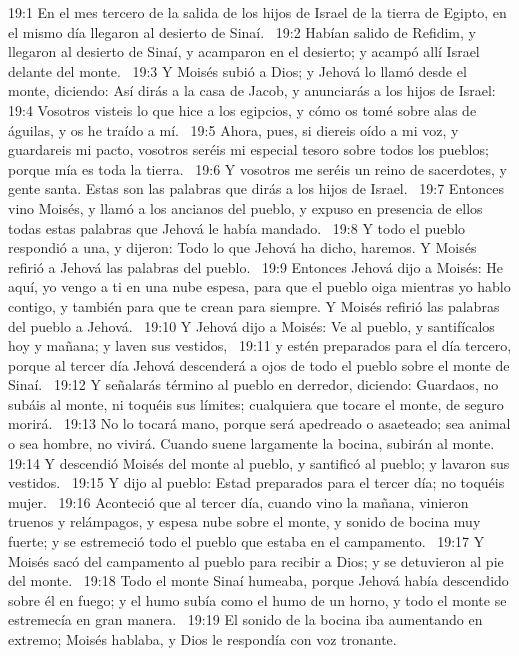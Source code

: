 19:1 En el mes tercero de la salida de los hijos de Israel de la tierra de Egipto, en el mismo día llegaron al desierto de Sinaí.  
19:2 Habían salido de Refidim, y llegaron al desierto de Sinaí, y acamparon en el desierto; y acampó allí Israel delante del monte.  
19:3 Y Moisés subió a Dios; y Jehová lo llamó desde el monte, diciendo: Así dirás a la casa de Jacob, y anunciarás a los hijos de Israel: 
19:4 Vosotros visteis lo que hice a los egipcios, y cómo os tomé sobre alas de águilas, y os he traído a mí.  
19:5 Ahora, pues, si diereis oído a mi voz, y guardareis mi pacto, vosotros seréis mi especial tesoro sobre todos los pueblos; porque mía es toda la tierra.  
19:6 Y vosotros me seréis un reino de sacerdotes, y gente santa. Estas son las palabras que dirás a los hijos de Israel.  
19:7 Entonces vino Moisés, y llamó a los ancianos del pueblo, y expuso en presencia de ellos todas estas palabras que Jehová le había mandado.  
19:8 Y todo el pueblo respondió a una, y dijeron: Todo lo que Jehová ha dicho, haremos. Y Moisés refirió a Jehová las palabras del pueblo.  
19:9 Entonces Jehová dijo a Moisés: He aquí, yo vengo a ti en una nube espesa, para que el pueblo oiga mientras yo hablo contigo, y también para que te crean para siempre. Y Moisés refirió las palabras del pueblo a Jehová.  
19:10 Y Jehová dijo a Moisés: Ve al pueblo, y santifícalos hoy y mañana; y laven sus vestidos,  
19:11 y estén preparados para el día tercero, porque al tercer día Jehová descenderá a ojos de todo el pueblo sobre el monte de Sinaí.  
19:12 Y señalarás término al pueblo en derredor, diciendo: Guardaos, no subáis al monte, ni toquéis sus límites; cualquiera que tocare el monte, de seguro morirá.  
19:13 No lo tocará mano, porque será apedreado o asaeteado; sea animal o sea hombre, no vivirá. Cuando suene largamente la bocina, subirán al monte.  
19:14 Y descendió Moisés del monte al pueblo, y santificó al pueblo; y lavaron sus vestidos.  
19:15 Y dijo al pueblo: Estad preparados para el tercer día; no toquéis mujer.  
19:16 Aconteció que al tercer día, cuando vino la mañana, vinieron truenos y relámpagos, y espesa nube sobre el monte, y sonido de bocina muy fuerte; y se estremeció todo el pueblo que estaba en el campamento.  
19:17 Y Moisés sacó del campamento al pueblo para recibir a Dios; y se detuvieron al pie del monte.  
19:18 Todo el monte Sinaí humeaba, porque Jehová había descendido sobre él en fuego; y el humo subía como el humo de un horno, y todo el monte se estremecía en gran manera.  
19:19 El sonido de la bocina iba aumentando en extremo; Moisés hablaba, y Dios le respondía con voz tronante.  
